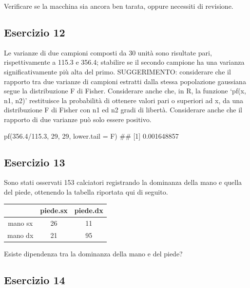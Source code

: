 \documentclass[a4paper,12pt,oneside]{book}
\newenvironment{Shaded}{\begin{snugshade}}{\end{snugshade}}
\newcommand{\DecValTok}[1]{#1}
\newcommand{\FloatTok}[1]{#1}
\newcommand{\SpecialCharTok}[1]{#1}
\newcommand{\DocumentationTok}[1]{#1}
\newcommand{\FunctionTok}[1]{#1}
\newcommand{\AttributeTok}[1]{#1}
\newcommand{\NormalTok}[1]{#1}
\begin{document}
Verificare se la macchina sia ancora ben tarata, oppure necessiti di revisione.

\hypertarget{esercizio-12}{%
\subsection{Esercizio 12}\label{esercizio-12}}

Le varianze di due campioni composti da 30 unità sono risultate pari, rispettivamente a 115.3 e 356.4; stabilire se il secondo campione ha una varianza significativamente più alta del primo. SUGGERIMENTO: considerare che il rapporto tra due varianze di campioni estratti dalla stessa popolazione gaussiana segue la distribuzione F di Fisher. Considerare anche che, in R, la funzione `pf(x, n1, n2)' restituisce la probabilità di ottenere valori pari o superiori ad x, da una distribuzione F di Fisher con n1 ed n2 gradi di libertà. Considerare anche che il rapporto di due varianze può solo essere positivo.

\begin{Shaded}
\begin{Highlighting}[]
\FunctionTok{pf}\NormalTok{(}\FloatTok{356.4}\SpecialCharTok{/}\FloatTok{115.3}\NormalTok{, }\DecValTok{29}\NormalTok{, }\DecValTok{29}\NormalTok{, }\AttributeTok{lower.tail =}\NormalTok{ F)}
\DocumentationTok{\#\# [1] 0.001648857}
\end{Highlighting}
\end{Shaded}

\hypertarget{esercizio-13}{%
\subsection{Esercizio 13}\label{esercizio-13}}

Sono stati osservati 153 calciatori registrando la dominanza della mano e quella del piede, ottenendo la tabella riportata qui di seguito.

\begin{longtable}[]{@{}ccc@{}}
\toprule()
& piede.sx & piede.dx \\
\midrule()
\endhead
mano sx & 26 & 11 \\
mano dx & 21 & 95 \\
\bottomrule()
\end{longtable}

Esiste dipendenza tra la dominanza della mano e del piede?

\hypertarget{esercizio-14}{%
\subsection{Esercizio 14}\label{esercizio-14}}
\end{document}
